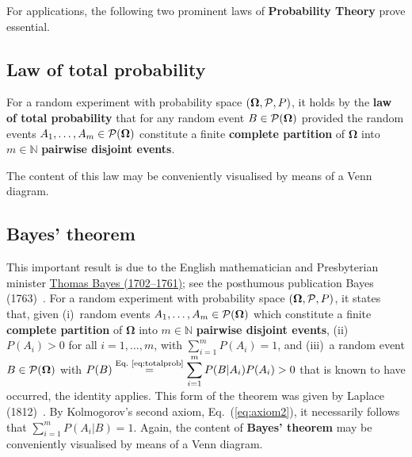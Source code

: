 \medskip
\noindent
For applications, the following two prominent laws of
\textbf{Probability Theory} prove essential.

\subsection[Law of total probability]{Law of total probability}
For a random experiment with probability space 
$\left(\boldsymbol{\Omega}, {\cal P}, P\right)$, it holds by the 
\textbf{law of total probability} that for any random event $B \in 
{\cal P}(\boldsymbol{\Omega})$
%
\be
{}
\ee
%
provided the random events $A_{1}, \ldots, A_{m} \in 
{\cal P}(\boldsymbol{\Omega})$ constitute a finite \textbf{complete 
partition} of $\boldsymbol{\Omega}$ into $m \in \mathbb{N}$
\textbf{pairwise disjoint events}.

\medskip
\noindent
The content of this law may be conveniently visualised by means of 
a Venn diagram.

\subsection[Bayes' theorem]{Bayes' theorem}
This important result is due to the English mathematician and
Presbyterian minister 
\href{http://www-history.mcs.st-and.ac.uk/Biographies/Bayes.html}{Thomas Bayes (1702--1761)}; see the posthumous publication Bayes 
(1763)~. For a random experiment with probability space
$\left(\boldsymbol{\Omega}, {\cal P}, P\right)$, it states that,
given (i)~random events $A_{1}, \ldots, A_{m} \in 
{\cal P}(\boldsymbol{\Omega})$ which constitute a finite
\textbf{complete partition} of $\boldsymbol{\Omega}$ into $m \in
\mathbb{N}$ \textbf{pairwise disjoint events}, (ii)~$P(A_{i}) > 0$
for all $i = 1, \ldots, m$, with $\displaystyle
\sum_{i=1}^{m}P(A_{i}) = 1$, and (iii)~a random event $B \in
{\cal P}(\boldsymbol{\Omega})$ with $\displaystyle 
P(B)\stackrel{\text{Eq.~\ref{eq:totalprob}}}{=}\sum_{i=1}^{m}
P(B|A_{i})P(A_{i}) > 0$ that is known to have occurred, the
identity
%
\be
{}
\ee
%
applies. This form of the theorem was given by Laplace
(1812)~. By Kolmogorov's second axiom,
Eq.~(\ref{eq:axiom2}), it necessarily follows that $\displaystyle
\sum_{i=1}^{m}P(A_{i}|B) = 1$. Again, the content of \textbf{Bayes'
theorem} may be conveniently visualised by means of a Venn diagram.

